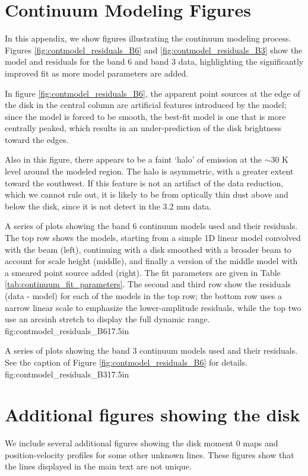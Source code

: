 \documentclass[twocolumn]{aastex61}
\begin{document}
\section{Continuum Modeling Figures}
\label{appendix:contmodel}
In this appendix, we show figures illustrating the continuum modeling process.
Figures \ref{fig:contmodel_residuals_B6} and \ref{fig:contmodel_residuals_B3}
show the model and residuals for the band 6 and band 3 data, highlighting the
significantly improved fit as more model parameters are added.

In figure \ref{fig:contmodel_residuals_B6}, the apparent point sources at the
edge of the disk in the central column are artificial features introduced by
the model; since the model is forced to be smooth, the best-fit model is one
that is more centrally peaked, which results in an under-prediction of the disk
brightness toward the edges.  

Also in this figure, there appears to be a faint `halo' of emission at the
$\sim30$ K level around the modeled region.  The halo is asymmetric, with a
greater extent toward the southwest.  If this feature is not an artifact of the
data reduction, which we cannot rule out, it is likely to be from optically
thin dust above and below the disk, since it is not detect in the 3.2 mm data.


{A series of plots showing the band 6 continuum models used and their residuals.
The top row shows the models, starting from a simple 1D linear model convolved
with the beam (left), continuing with a disk smoothed with a broader beam to
account for scale height (middle), and finally a version of the middle model
with a smeared point source added (right).  The fit parameters are given in Table
\ref{tab:continuum_fit_parameters}.  The second and third row show the
residuals (data - model) for each of the models in the top row; the bottom row
uses a narrow linear scale to emphasize the lower-amplitude residuals, while
the top two use an arcsinh stretch to display the full dynamic range.
}
{fig:contmodel_residuals_B6}{1}{7.5in}


{A series of plots showing the band 3 continuum models used and their residuals.
See the caption of Figure \ref{fig:contmodel_residuals_B6} for details.
}
{fig:contmodel_residuals_B3}{1}{7.5in}

\section{Additional figures showing the disk}
We include several additional figures showing the disk moment 0 maps and
position-velocity profiles for some other unknown lines.  These figures show
that the lines displayed in the main text are not unique.
\end{document}
